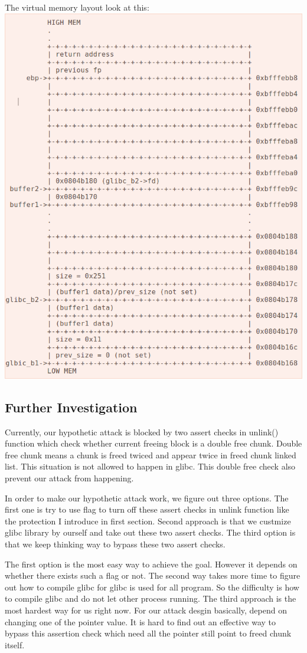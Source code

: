 \documentclass[12pt]{article}
\begin{document}
The virtual memory layout look at this:\\
\includegraphics[scale=0.5]{compromised_layout.png}

\subsection{Further Investigation}

Currently, our hypothetic attack is blocked by two assert checks in unlink() function which check whether current freeing block is a double free chunk. Double free chunk means a chunk is freed twiced and appear twice in freed chunk linked list. This situation is not allowed to happen in glibc. This double free check also prevent our attack from happening. 

In order to make our hypothetic attack work, we figure out three options. The first one is try to use flag to turn off these assert checks in unlink function like the protection I introduce in first section. Second approach is that we custmize glibc library by ourself and take out these two assert checks. The third option is that we keep thinking way to bypass these two assert checks.

The first option is the most easy way to achieve the goal. However it depends on whether there exists such a flag or not. The second way takes more time to figure out how to compile glibc for glibc is used for all program. So the difficulty is how to compile glibc and do not let other process running. The third approach is the most hardest way for us right now. For our attack desgin basically, depend on changing one of the pointer value. It is hard to find out an effective way to bypass this assertion check which need all the pointer still point to freed chunk itself. 
\end{document}

